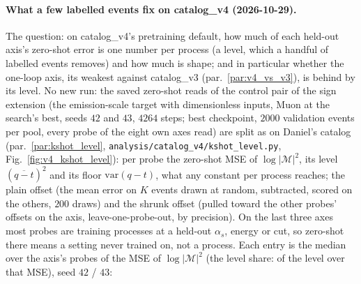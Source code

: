 \documentclass[11pt]{article}
\newcommand{\code}[1]{\texttt{#1}}
\begin{document}
\paragraph{What a few labelled events fix on catalog\_v4 (2026-10-29).}\label{par:v4_kshot_level} The question: on
catalog\_v4's pretraining default, how much of each held-out axis's zero-shot error is one number per process (a level,
which a handful of labelled events removes) and how much is shape; and in particular whether the one-loop axis, its
weakest against catalog\_v3 (par.~\ref{par:v4_vs_v3}), is behind by its level. No new run: the saved zero-shot reads of
the control pair of the sign extension (the emission-scale target with dimensionless inputs, Muon at the search's best,
seeds $42$ and $43$, $4264$ steps; best checkpoint, $2000$ validation events per pool, every probe of the eight own axes
read) are split as on Daniel's catalog (par.~\ref{par:kshot_level}, \code{analysis/catalog\_v4/kshot\_level.py},
Fig.~\ref{fig:v4_kshot_level}): per probe the zero-shot MSE of $\log|\mathcal M|^2$, its level $(\overline{q-t})^2$ and
its floor $\mathrm{var}(q-t)$, what any constant per process reaches; the plain offset (the mean error on $K$ events
drawn at random, subtracted, scored on the others, $200$ draws) and the shrunk offset (pulled toward the other probes'
offsets on the axis, leave-one-probe-out, by precision). On the last three axes most probes are training
processes at a held-out $\alpha_s$, energy or cut, so zero-shot there means a setting never trained on, not a process.
Each entry is the median over the axis's probes of the MSE of $\log|\mathcal M|^2$ (the level share: of the level over
that MSE), seed $42$ / $43$:
\end{document}
